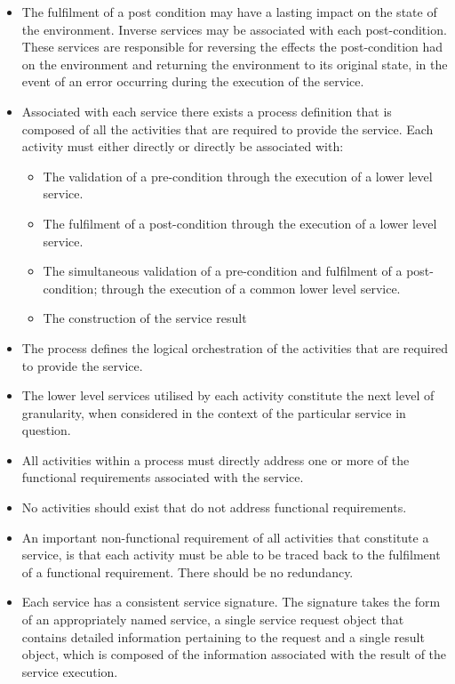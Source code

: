 \begin{itemize}
\begin{itemize}
\begin{itemize}
					\item The fulfilment of a post condition may have a lasting impact on the state of the environment. Inverse services may be associated with each post-condition. These services are responsible for reversing the effects the post-condition had on the environment and returning the environment to its original state, in the event of an error occurring during the execution of the service.
					\item Associated with each service there exists a process definition that is composed of all the activities that are required to provide the service. Each activity must either directly or directly be associated with:
						\begin{itemize}
							\item The validation of a pre-condition through the execution of a lower level service.
							\item The fulfilment of a post-condition through the execution of a lower level service.
							\item The simultaneous validation of a pre-condition and fulfilment of a post-condition; through the execution of a common lower level service.
							\item The construction of the service result
						\end{itemize}
					\item The process defines the logical orchestration of the activities that are required to provide the service.
					\item The lower level services utilised by each activity constitute the next level of granularity, when considered in the context of the particular service in question.
					\item All activities within a process must directly address one or more of the functional requirements associated with the service.
					\item No activities should exist that do not address functional requirements.
					\item An important non-functional requirement of all activities that constitute a service, is that each activity must be able to be traced back to the fulfilment of a functional requirement. There should be no redundancy.
					\item Each service has a consistent service signature. The signature takes the form of an appropriately named service, a single service request object that contains detailed information pertaining to the request and a single result object, which is composed of the information associated with the result of the service execution.

\end{itemize}
\end{itemize}
\end{itemize}

